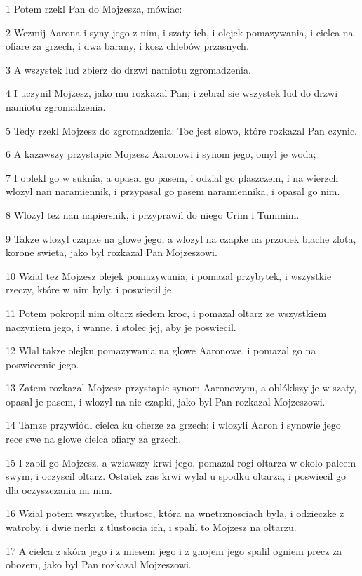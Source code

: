\par 1 Potem rzekl Pan do Mojzesza, mówiac:
\par 2 Wezmij Aarona i syny jego z nim, i szaty ich, i olejek pomazywania, i cielca na ofiare za grzech, i dwa barany, i kosz chlebów przasnych.
\par 3 A wszystek lud zbierz do drzwi namiotu zgromadzenia.
\par 4 I uczynil Mojzesz, jako mu rozkazal Pan; i zebral sie wszystek lud do drzwi namiotu zgromadzenia.
\par 5 Tedy rzekl Mojzesz do zgromadzenia: Toc jest slowo, które rozkazal Pan czynic.
\par 6 A kazawszy przystapic Mojzesz Aaronowi i synom jego, omyl je woda;
\par 7 I oblekl go w suknia, a opasal go pasem, i odzial go plaszczem, i na wierzch wlozyl nan naramiennik, i przypasal go pasem naramiennika, i opasal go nim.
\par 8 Wlozyl tez nan napiersnik, i przyprawil do niego Urim i Tummim.
\par 9 Takze wlozyl czapke na glowe jego, a wlozyl na czapke na przodek blache zlota, korone swieta, jako byl rozkazal Pan Mojzeszowi.
\par 10 Wzial tez Mojzesz olejek pomazywania, i pomazal przybytek, i wszystkie rzeczy, które w nim byly, i poswiecil je.
\par 11 Potem pokropil nim oltarz siedem kroc, i pomazal oltarz ze wszystkiem naczyniem jego, i wanne, i stolec jej, aby je poswiecil.
\par 12 Wlal takze olejku pomazywania na glowe Aaronowe, i pomazal go na poswiecenie jego.
\par 13 Zatem rozkazal Mojzesz przystapic synom Aaronowym, a oblóklszy je w szaty, opasal je pasem, i wlozyl na nie czapki, jako byl Pan rozkazal Mojzeszowi.
\par 14 Tamze przywiódl cielca ku ofierze za grzech; i wlozyli Aaron i synowie jego rece swe na glowe cielca ofiary za grzech.
\par 15 I zabil go Mojzesz, a wziawszy krwi jego, pomazal rogi oltarza w okolo palcem swym, i oczyscil oltarz. Ostatek zas krwi wylal u spodku oltarza, i poswiecil go dla oczyszczania na nim.
\par 16 Wzial potem wszystke, tlustosc, która na wnetrznosciach byla, i odzieczke z watroby, i dwie nerki z tlustoscia ich, i spalil to Mojzesz na oltarzu.
\par 17 A cielca z skóra jego i z miesem jego i z gnojem jego spalil ogniem precz za obozem, jako byl Pan rozkazal Mojzeszowi.
